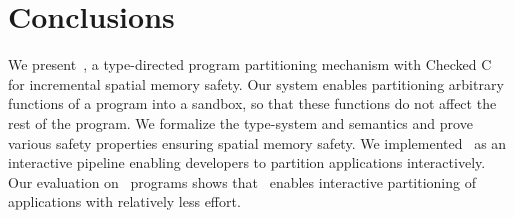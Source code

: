 \section{Conclusions}
\label{sec:conclude}
We present~\systemname{}, a type-directed program partitioning mechanism with Checked C for incremental spatial memory safety.
Our system enables partitioning arbitrary functions of a program into a sandbox, so that these functions do not affect the rest of the program.
We formalize the type-system and semantics and prove various safety properties ensuring spatial memory safety.
We implemented~\systemname{} as an interactive pipeline enabling developers to partition applications interactively.
Our evaluation on~\numprog{} programs shows that~\systemname{} enables interactive partitioning of applications with relatively less effort.

%
